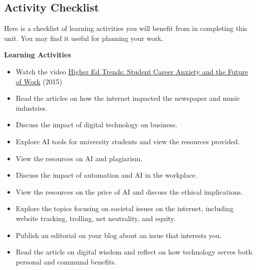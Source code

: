 \documentclass[
  letterpaper,
  DIV=11,
  numbers=noendperiod]{scrreprt}
\providecommand{\tightlist}{%
  \setlength{\itemsep}{0pt}\setlength{\parskip}{0pt}}\usepackage{longtable,booktabs,array}
\begin{document}
\subsection*{Activity Checklist}\label{activity-checklist-5}

Here is a checklist of learning activities you will benefit from in
completing this unit. You may find it useful for planning your work.

\begin{tcolorbox}[enhanced jigsaw, toprule=.15mm, colback=white, colframe=quarto-callout-note-color-frame, bottomtitle=1mm, leftrule=.75mm, coltitle=black, titlerule=0mm, rightrule=.15mm, colbacktitle=quarto-callout-note-color!10!white, left=2mm, title={Learning Activity}, opacitybacktitle=0.6, opacityback=0, breakable, toptitle=1mm, arc=.35mm, bottomrule=.15mm]

\textbf{Learning Activities}

\begin{itemize}
\tightlist
\item
  Watch the video
  \href{https://www.youtube.com/watch?v=iY4UhfQefdU}{Higher Ed Trends:
  Student Career Anxiety and the Future of Work} (2015)
\item
  Read the articles on how the internet impacted the newspaper and music
  industries.
\item
  Discuss the impact of digital technology on business.
\item
  Explore AI tools for university students and view the resources
  provided.
\item
  View the resources on AI and plagiarism.
\item
  Discuss the impact of automation and AI in the workplace.
\item
  View the resources on the price of AI and discuss the ethical
  implications.
\item
  Explore the topics focusing on societal issues on the internet,
  including website tracking, trolling, net neutrality, and equity.
\item
  Publish an editorial on your blog about an issue that interests you.
\item
  Read the article on digital wisdom and reflect on how technology
  serves both personal and communal benefits.
\end{itemize}

\begin{tcolorbox}[enhanced jigsaw, toprule=.15mm, colback=white, colframe=quarto-callout-note-color-frame, arc=.35mm, opacityback=0, breakable, rightrule=.15mm, bottomrule=.15mm, leftrule=.75mm, left=2mm]


\end{tcolorbox}
\end{tcolorbox}
\end{document}
